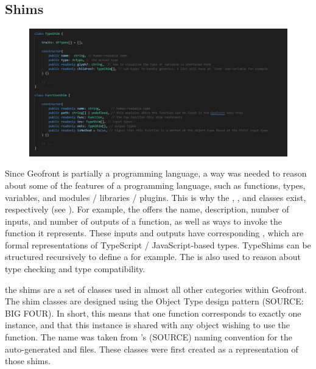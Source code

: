 \subsection{Shims}

\begin{figure}
  \centering
  \graphicspath{ {../../assets/images/implementation/} }
  \includegraphics[width=\linewidth]{shim-uml.png}
  \caption[Shim Classes]{}
  \label{fig:shim-classes}
\end{figure}

Since Geofront is partially a programming language, a way was needed to reason about some of the features of a programming language, such as functions, types, variables, and modules / libraries / plugins. 
This is why the , ,  and  classes exist, respectively (see ). 
For example, the  offers the name, description, number of inputs, and number of outputs of a function, as well as ways to invoke the function it represents.
These inputs and outputs have corresponding , which are formal representations of TypeScript / JavaScript-based types. 
TypeShims can be structured recursively to define a  for example. The  is also used to reason about type checking and type compatibility.

the shims are a set of classes used in almost all other categories within Geofront. 
The shim classes are designed using the Object Type design pattern (SOURCE: BIG FOUR). 
In short, this means that one function corresponds to exactly one  instance, and that this instance is shared with any object wishing to use the function. 
The name  was taken from 's (SOURCE) naming convention for the auto-generated  and  files. These classes were first created as a representation of those shims.


